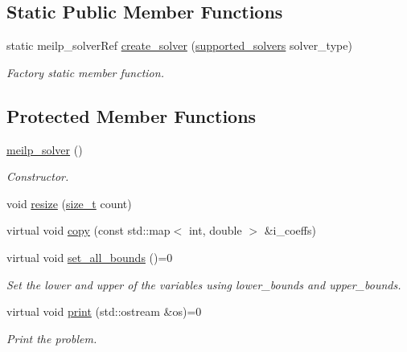 \subsection*{Static Public Member Functions}
\begin{DoxyCompactItemize}
\item 
static meilp\+\_\+solver\+Ref \hyperlink{classmeilp__solver_a77048480479b25895144987d41b9098b}{create\+\_\+solver} (\hyperlink{classmeilp__solver_ac258f0ae8866c02ac01796f22db67b7a}{supported\+\_\+solvers} solver\+\_\+type)
\begin{DoxyCompactList}\small\item\em Factory static member function. \end{DoxyCompactList}\end{DoxyCompactItemize}
\subsection*{Protected Member Functions}
\begin{DoxyCompactItemize}
\item 
\hyperlink{classmeilp__solver_a36ff660134675780ed9ef03c9d22847d}{meilp\+\_\+solver} ()
\begin{DoxyCompactList}\small\item\em Constructor. \end{DoxyCompactList}\item 
void \hyperlink{classmeilp__solver_a4c58b5afa4d7061540b8cb93213b8154}{resize} (\hyperlink{tutorial__fpt__2017_2intro_2sixth_2test_8c_a7c94ea6f8948649f8d181ae55911eeaf}{size\+\_\+t} count)
\item 
virtual void \hyperlink{classmeilp__solver_a94b27ed47dbe2872cfc119df010dbc7d}{copy} (const std\+::map$<$ int, double $>$ \&i\+\_\+coeffs)
\item 
virtual void \hyperlink{classmeilp__solver_abf7a38326551db34e423396517198895}{set\+\_\+all\+\_\+bounds} ()=0
\begin{DoxyCompactList}\small\item\em Set the lower and upper of the variables using lower\+\_\+bounds and upper\+\_\+bounds. \end{DoxyCompactList}\item 
virtual void \hyperlink{classmeilp__solver_ae7889c65c08ee542bba4913b853e0714}{print} (std\+::ostream \&os)=0
\begin{DoxyCompactList}\small\item\em Print the problem. \end{DoxyCompactList}\end{DoxyCompactItemize}
